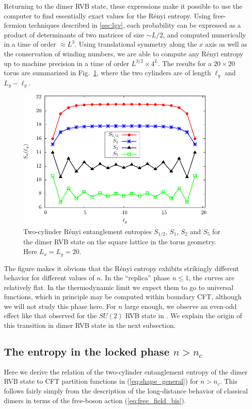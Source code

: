 \documentclass[11pt]{iopart}
\begin{document}
Returning to the dimer RVB state, these expressions make it possible to use the computer to find essentially exact values for the R\'enyi entropy. Using free-fermion techniques described in \ref{sec:lgv}, each probability can be expressed as a product of determinants of two matrices of size $\sim L/2$, and computed numerically in a time of order $\approx L^3$. Using translational symmetry along the $x$ axis as well as the conservation of winding numbers, we are able to compute any R\'enyi entropy up to machine precision in a time of order $L^{3/2}\times 4^L$.
The results for a $20\times 20$ torus are summarized in Fig.~\ref{fig:ee_d_torus}, where the two cylinders are of length $\ell_y$ and $L_y-\ell_y$. 
\begin{figure}[ht]
 \begin{center}
 \includegraphics[width=10cm]{./figures/ee_d_torus.pdf}
 \end{center}
\caption{Two-cylinder R\'enyi entanglement entropies $S_{1/2}$, $S_1$, $S_2$ and $S_5$ for the dimer RVB state on the square lattice in the torus geometry. Here $L_x=L_y=20$.}
\label{fig:ee_d_torus}
\end{figure}
The figure makes it obvious that the R\'enyi entropy exhibits strikingly different behavior for different values of $n$. In the ``replica'' phase $n \leq 1$, the curves are relatively flat. In the thermodynamic limit we expect them to go to universal functions, which in principle may be computed within boundary CFT, although we will not study this phase here. For $n$ large enough, we observe an even-odd effect like that observed for the $SU(2)$ RVB state in \cite{Ju2012}. We explain the origin of this transition in dimer RVB state in the next subsection.



\subsection{The entropy in the locked phase $n>n_c$}
\label{sec:bpt}
Here we derive the relation of the two-cylinder entanglement entropy of the dimer RVB state to CFT partition functions in 
(\ref{eq:shape_general}) for $n>n_c$. This follows fairly simply from the description of the long-distance behavior of classical dimers in terms of the free-boson action (\ref{eq:free_field_bis}).
\end{document}
